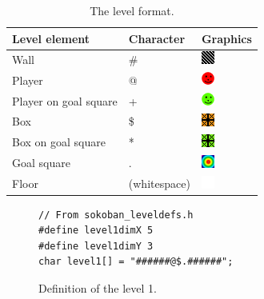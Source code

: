 \documentclass[a4paper,11pt]{article}
\begin{document}
\begin{table}[H]
\centering
\begin{tabular}{|l|l|l|}
\hline \textbf{Level element} & \textbf{Character} & \textbf{Graphics} \\ 
\hline Wall & \# & \includegraphics[scale=0.6]{images/wall.png} \\ 
\hline Player & @ & \includegraphics[scale=0.6]{images/player.png} \\ 
\hline Player on goal square & + & \includegraphics[scale=0.6]{images/playertarget.png} \\ 
\hline Box & \$ & \includegraphics[scale=0.6]{images/crate.png}\\ 
\hline Box on goal square & * & \includegraphics[scale=0.6]{images/cratetarget.png}\\ 
\hline Goal square & . & \includegraphics[scale=0.6]{images/target.png}\\ 
\hline Floor & (whitespace) & \includegraphics[scale=0.6]{images/blank.png} \\ 
\hline 
\end{tabular}
\caption{The level format.}
\label{tab:levelformat}
\end{table}

\begin{figure}[H]
\begin{lstlisting}
// From sokoban_leveldefs.h
#define level1dimX 5
#define level1dimY 3
char level1[] = "######@$.######";
\end{lstlisting}
\caption{Definition of the level 1.}
\label{fig:leveldef}
\end{figure}
\end{document}
